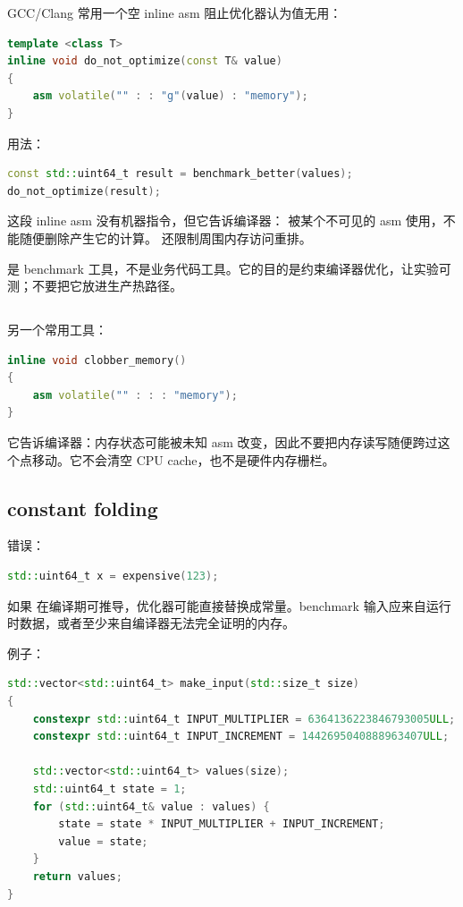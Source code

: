 GCC/Clang 常用一个空 inline asm 阻止优化器认为值无用：

\begin{lstlisting}[language=C++]
template <class T>
inline void do_not_optimize(const T& value)
{
    asm volatile("" : : "g"(value) : "memory");
}
\end{lstlisting}

用法：

\begin{lstlisting}[language=C++]
const std::uint64_t result = benchmark_better(values);
do_not_optimize(result);
\end{lstlisting}

这段 inline asm 没有机器指令，但它告诉编译器： 被某个不可见的 asm 使用，不能随便删除产生它的计算。 还限制周围内存访问重排。

\begin{warningbox}
 是 benchmark 工具，不是业务代码工具。它的目的是约束编译器优化，让实验可测；不要把它放进生产热路径。
\end{warningbox}

\subsection{}

另一个常用工具：

\begin{lstlisting}[language=C++]
inline void clobber_memory()
{
    asm volatile("" : : : "memory");
}
\end{lstlisting}

它告诉编译器：内存状态可能被未知 asm 改变，因此不要把内存读写随便跨过这个点移动。它不会清空 CPU cache，也不是硬件内存栅栏。

\subsection{constant folding}

错误：

\begin{lstlisting}[language=C++]
std::uint64_t x = expensive(123);
\end{lstlisting}

如果  在编译期可推导，优化器可能直接替换成常量。benchmark 输入应来自运行时数据，或者至少来自编译器无法完全证明的内存。

例子：

\begin{lstlisting}[language=C++]
std::vector<std::uint64_t> make_input(std::size_t size)
{
    constexpr std::uint64_t INPUT_MULTIPLIER = 6364136223846793005ULL;
    constexpr std::uint64_t INPUT_INCREMENT = 1442695040888963407ULL;

    std::vector<std::uint64_t> values(size);
    std::uint64_t state = 1;
    for (std::uint64_t& value : values) {
        state = state * INPUT_MULTIPLIER + INPUT_INCREMENT;
        value = state;
    }
    return values;
}
\end{lstlisting}

